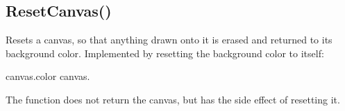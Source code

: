 \documentclass[letterpaper,10pt,english]{sphinxmanual}
\begin{document}
\ignorespaces 

\subsection{ResetCanvas()}
\label{\detokenize{reference/graphics:resetcanvas}}\label{\detokenize{reference/graphics:index-15}}
\sphinxAtStartPar
{}

\sphinxAtStartPar
{}

\sphinxAtStartPar
Resets a canvas, so that anything drawn onto it is   erased and returned to its background color.  Implemented by   resetting the background color to itself:

\begin{sphinxVerbatim}[commandchars=\\\{\}]
 canvas.color \PYGZlt{}\PYGZhy{} canvas.

The function does not return the canvas,   but has the side effect of resetting it.
\end{sphinxVerbatim}

\sphinxAtStartPar
{}

\begin{sphinxVerbatim}[commandchars=\\\{\}]
\end{sphinxVerbatim}

\sphinxAtStartPar
{}
\end{document}
